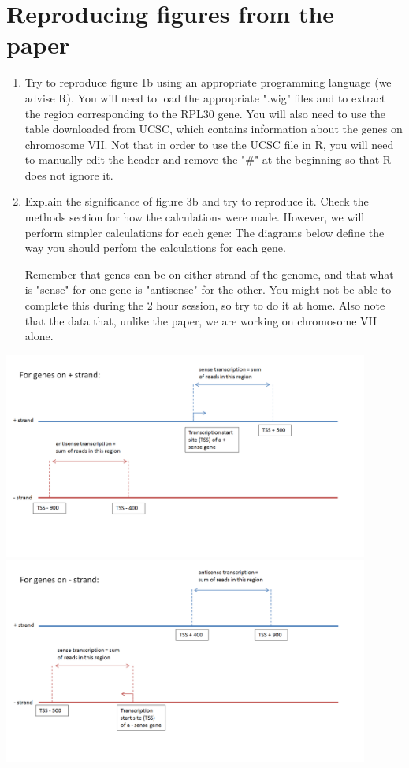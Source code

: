 \documentclass[a4paper,11pt]{article}
\begin{document}
\section{Reproducing figures from the paper}
\begin{enumerate}
\item Try to reproduce figure 1b using an appropriate programming language (we advise R). You will need to load the appropriate ".wig" files and to extract the region corresponding to the RPL30 gene. You will also need to use the table downloaded from UCSC, which contains information about the genes on chromosome VII. Not that in order to use the UCSC file in R, you will need to manually edit the header and remove the "\#" at the beginning so that R does not ignore it.
\item Explain the significance of figure 3b and try to reproduce it. Check the methods section for how the calculations were made. However, we will perform simpler calculations for each gene:
The diagrams below define the way you should perfom the calculations for each gene. 

Remember that genes can be on either strand of the genome, and that what is "sense" for one gene is "antisense" for the other. You might not be able to complete this during the 2 hour session, so try to do it at home. Also note that the data that, unlike the paper, we are working on chromosome VII alone.
\end{enumerate}
\begin{center}
\includegraphics[width=0.9\textwidth]{positive_gene.png}\\
\vspace{0.1cm}
\includegraphics[width=0.9\textwidth]{negative_gene.png}\\
\end{center}
\end{document}
